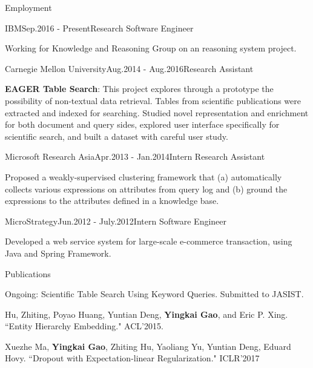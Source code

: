 \documentclass{resume} %
\begin{document}
\begin{rSection}{Employment}

\begin{rSubsection}{IBM}{Sep.2016 - Present}{Research Software Engineer}{}
\item Working for Knowledge and Reasoning Group on an reasoning system project.
\end{rSubsection}

\begin{rSubsection}{Carnegie Mellon University}{Aug.2014 - Aug.2016}{Research Assistant}{}
\item \textbf{EAGER Table Search}: This project explores through a prototype the possibility of non-textual data retrieval.
Tables from scientific publications were extracted and indexed for searching.  Studied novel representation and enrichment
for both document and query sides, explored user interface specifically for scientific search, and built a dataset with
careful user study.
\end{rSubsection}

\begin{rSubsection}{Microsoft Research Asia}{Apr.2013 - Jan.2014}{Intern Research Assistant}{}
\item Proposed a weakly-supervised clustering framework that (a) automatically collects various expressions on attributes from query log and 
(b) ground the expressions to the attributes defined in a knowledge base.
\end{rSubsection}

\begin{rSubsection}{MicroStrategy}{Jun.2012 - July.2012}{Intern Software Engineer}{}
\item Developed a web service system for large-scale e-commerce transaction, using Java and Spring Framework.
\end{rSubsection}

\end{rSection}

\begin{rSection}{Publications}
\begin{rSubsection}{}{}{}{}
\item Ongoing: Scientific Table Search Using Keyword Queries. Submitted to JASIST.
\item Hu, Zhiting, Poyao Huang, Yuntian Deng, \textbf{Yingkai Gao}, and Eric P. Xing. ``Entity Hierarchy Embedding." ACL'2015.
\item Xuezhe Ma, \textbf{Yingkai Gao}, Zhiting Hu, Yaoliang Yu, Yuntian Deng, Eduard Hovy. ``Dropout with Expectation-linear Regularization." ICLR'2017
\end{rSubsection}
\end{rSection}
\end{document}
